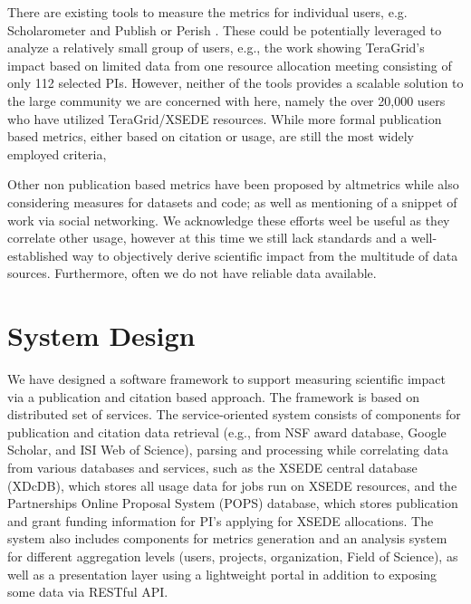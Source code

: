 \documentclass{sig-alternate}
\begin{document}
There are existing tools to measure the metrics for individual users, e.g. Scholarometer \cite{kaur2012scholarometer} and Publish or Perish \cite{www-pop}. These could be potentially leveraged to analyze a relatively small group of users, e.g., the work \cite{bollen2011and} showing TeraGrid's impact based on limited data from one resource allocation meeting consisting of only 112 selected PIs.  However, neither of the tools provides a scalable solution to the large community we are concerned with here, namely the over 20,000 users who have utilized TeraGrid/XSEDE resources.  While more formal publication based metrics, either based on citation or usage, are still the most widely employed criteria, 

Other non publication based metrics have been proposed by altmetrics \cite{www-altmetrics} while also considering measures for datasets and code; as well as mentioning of a snippet of work via social networking. We acknowledge these efforts weel be useful as they correlate other usage, however at this time we still lack standards and a well-established way to objectively derive scientific impact from the multitude of data sources. Furthermore, often we do not have reliable data available.



\section{System Design} \label{S:design} We have designed a software framework to support measuring scientific impact via a publication and citation based approach. The framework is based on distributed set of services. The service-oriented system consists of components for publication and citation data retrieval (e.g., from NSF award database, Google Scholar, and ISI Web of Science), parsing and processing while correlating data from various databases and services, such as the XSEDE central database (XDcDB), which stores all usage data for jobs run on XSEDE resources, and the Partnerships Online Proposal System (POPS) database, which stores publication and grant funding information for PI's applying for XSEDE allocations. The system also includes components for metrics generation and an analysis system for different aggregation levels (users, projects, organization, Field of Science), as well as a presentation layer using a lightweight portal in addition to exposing some data via RESTful API.
\end{document}

